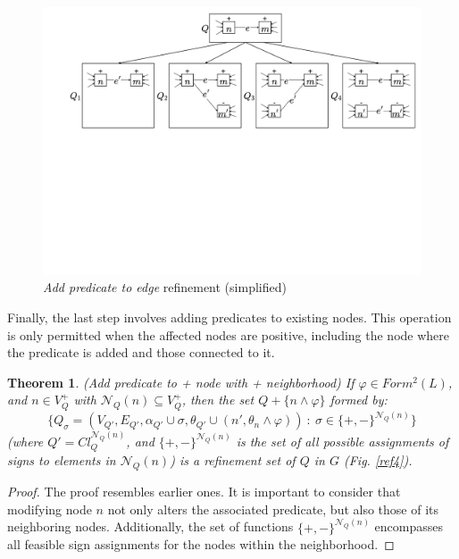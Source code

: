 \documentclass[mathematics,article,submit,pdftex,moreauthors]{Definitions/mdpi}
\newtheorem{theorem}{Theorem}
\begin{document}
\begin{figure}[h]
    \begin{center}
        \includegraphics[width=\columnwidth]{png/REF3SIM.pdf}
    \end{center}
    \caption{%
	\textit{Add predicate to edge} refinement (simplified)
    }%
    \label{ref3}
\end{figure}

Finally, the last step involves adding predicates to existing nodes. This operation is only permitted when the affected nodes are positive, including the node where the predicate is added and those connected to it.

\begin{theorem}{(Add predicate to + node with + neighborhood)}
    If $\varphi\in Form^2(L)$, and $n\in V_Q^+$ with $\mathcal{N}_Q(n)\subseteq V_Q^+$, then the set $Q+\{n\wedge \varphi\}$ formed by:
    $$\{Q_{\sigma}=(V_{Q'},E_{Q'},\alpha_{Q'}\cup \sigma,\theta_{Q'}\cup(n',\theta_n\wedge\varphi))\ :\ \sigma\in \{+,-\}^{\mathcal{N}_Q(n)}\}$$ 	
(where $Q'=Cl_Q^{\mathcal{N}_Q(n)}$, and $\{+,-\}^{\mathcal{N}_Q(n)}$ is the set of all possible assignments of signs to elements in $\mathcal{N}_Q(n)$)
is a refinement set of $Q$ in $G$ (Fig. \ref{ref4}).
\end{theorem}
\normalsize
\begin{proof}{}
	The proof resembles earlier ones. It is important to consider that modifying node $n$ not only alters the associated predicate, but also those of its neighboring nodes. Additionally, the set of functions $\{+, -\}^{\mathcal{N}_Q(n)}$ encompasses all feasible sign assignments for the nodes within the neighborhood.
\end{proof}
\end{document}
